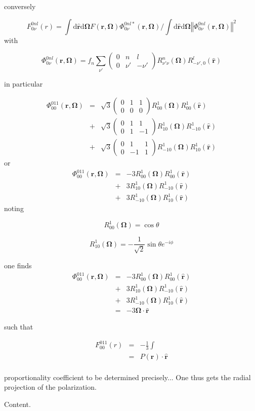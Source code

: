 conversely

\[
F_{0\nu}^{0nl}(r)=\int\mathrm{d}\hat{\mathbf{r}}\mathrm{d}\mathbf{\Omega}F(\mathbf{r},\mathbf{\Omega})\Phi_{0\nu}^{0nl*}(\mathbf{r},\mathbf{\Omega})/\int\mathrm{d}\hat{\mathbf{r}}\mathrm{d}\mathbf{\Omega}\left\Vert \Phi_{0\nu}^{0nl}(\mathbf{r},\mathbf{\Omega})\right\Vert ^{2}
\]
with

\[
\Phi_{0\nu}^{0nl}(\mathbf{r},\mathbf{\Omega})=f_{n}\sum_{\nu'}\left(\begin{array}{ccc}
0 & n & l\\
0 & \nu' & -\nu'
\end{array}\right)R_{\nu'\nu}^{n}(\mathbf{\Omega})R_{-\nu',0}^{l}(\mathbf{\hat{r}})
\]

in particular

\begin{eqnarray*}
\Phi_{00}^{011}(\mathbf{r},\mathbf{\Omega}) & = & \sqrt{3}\left(\begin{array}{ccc}
0 & 1 & 1\\
0 & 0 & 0
\end{array}\right)R_{00}^{1}(\mathbf{\Omega})R_{00}^{1}(\mathbf{\hat{r}})\\
 & + & \sqrt{3}\left(\begin{array}{ccc}
0 & 1 & 1\\
0 & 1 & -1
\end{array}\right)R_{10}^{1}(\mathbf{\Omega})R_{-10}^{1}(\mathbf{\hat{r}})\\
 & + & \sqrt{3}\left(\begin{array}{ccc}
0 & 1 & 1\\
0 & -1 & 1
\end{array}\right)R_{-10}^{1}(\mathbf{\Omega})R_{10}^{1}(\mathbf{\hat{r}})
\end{eqnarray*}
or
\begin{eqnarray*}
\Phi_{00}^{011}(\mathbf{r},\mathbf{\Omega}) & = & -3R_{00}^{1}(\mathbf{\Omega})R_{00}^{1}(\mathbf{\hat{r}})\\
 & + & 3R_{10}^{1}(\mathbf{\Omega})R_{-10}^{1}(\mathbf{\hat{r}})\\
 & + & 3R_{-10}^{1}(\mathbf{\Omega})R_{10}^{1}(\mathbf{\hat{r}})
\end{eqnarray*}
noting 

\[
R_{00}^{1}(\mathbf{\Omega})=\cos\theta
\]

\[
R_{10}^{1}(\mathbf{\Omega})=-\frac{1}{\sqrt{2}}\sin\theta e^{-i\phi}
\]

one finds
\begin{eqnarray*}
\Phi_{00}^{011}(\mathbf{r},\mathbf{\Omega}) & = & -3R_{00}^{1}(\mathbf{\Omega})R_{00}^{1}(\mathbf{\hat{r}})\\
 & + & 3R_{10}^{1}(\mathbf{\Omega})R_{-10}^{1}(\mathbf{\hat{r}})\\
 & + & 3R_{-10}^{1}(\mathbf{\Omega})R_{10}^{1}(\mathbf{\hat{r}})\\
 & = & -3\mathbf{\Omega}\cdot\hat{\mathbf{r}}
\end{eqnarray*}

such that

\begin{eqnarray*}
F_{00}^{011}(r) & = & -\frac{1}{3}\int\\
 & = & P(\mathbf{r})\cdot\hat{\mathbf{r}}\\
\end{eqnarray*}

proportionality coefficient to be determined precisely... One thus
gets the radial projection of the polarization.

Content.

